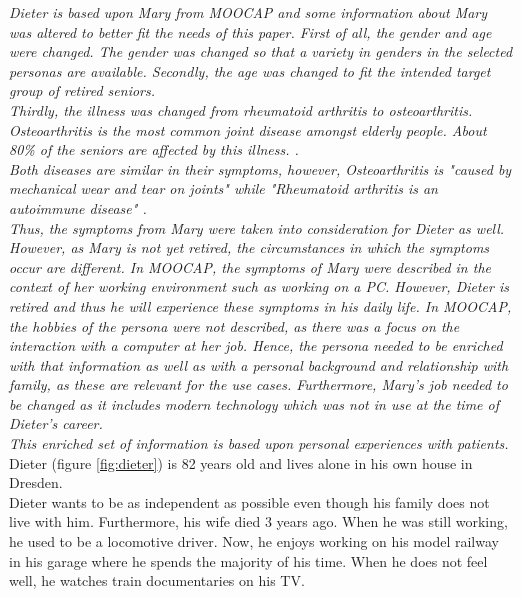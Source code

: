 \documentclass[plainarticle,zihtitle,english,final,hyperref,utf8]{zihpub}
\begin{document}
\emph{Dieter is based upon  Mary \cite{mary} from MOOCAP and some information about Mary was altered to better fit the needs of this paper. First of all, the gender and age were changed. The gender was changed so that a variety in genders in the selected personas are available. Secondly, the age was changed to fit the intended target group of retired seniors.\\
\newline
Thirdly, the illness was changed from rheumatoid arthritis to osteoarthritis. Osteoarthritis is the most common joint disease amongst elderly people. About 80\% of the seniors are affected by this illness. \cite{ARDEN20063} \cite{rheumanetz}.\\
Both diseases are similar in their symptoms, however, Osteoarthritis is "caused by mechanical wear and tear on joints" while "Rheumatoid arthritis is an autoimmune disease" \cite{healthwise}.\\
\newline
Thus, the symptoms from Mary were taken into consideration for Dieter as well. However, as Mary is not yet retired, the circumstances in which the symptoms occur are different. In MOOCAP, the symptoms of Mary were described in the context of her working environment such as working on a PC. However, Dieter is retired and thus he will experience these symptoms in his daily life. In MOOCAP, the hobbies of the persona were not described, as there was a focus on the interaction with a computer at her job. Hence, the persona needed to be enriched with that information as well as with a personal background and relationship with family, as these are relevant for the use cases. Furthermore, Mary's job needed to be changed as it includes modern technology which was not in use at the time of Dieter's career.\\
\newline
This enriched set of information is based upon personal experiences with patients.
}\\
\newline
Dieter (figure \ref{fig:dieter}) is 82 years old and lives alone in his own house in Dresden. \\
Dieter wants to be as independent as possible even though his family does not live with him. Furthermore, his wife died 3 years ago. When he was still working, he used to be a locomotive driver. Now, he enjoys working on his model railway in his garage where he spends the majority of his time. When he does not feel well, he watches train documentaries on his TV.\\
\end{document}
